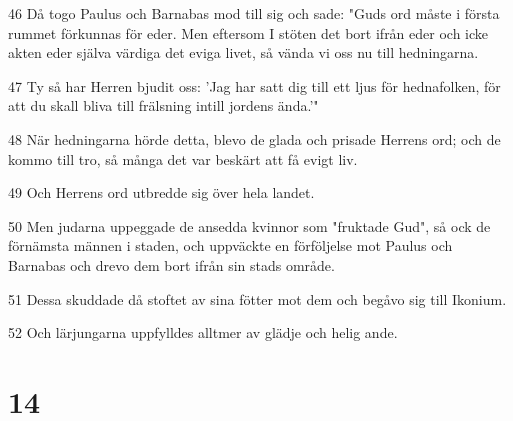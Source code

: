\par 46 Då togo Paulus och Barnabas mod till sig och sade: "Guds ord måste i första rummet förkunnas för eder. Men eftersom I stöten det bort ifrån eder och icke akten eder själva värdiga det eviga livet, så vända vi oss nu till hedningarna.
\par 47 Ty så har Herren bjudit oss: 'Jag har satt dig till ett ljus för hednafolken, för att du skall bliva till frälsning intill jordens ända.'"
\par 48 När hedningarna hörde detta, blevo de glada och prisade Herrens ord; och de kommo till tro, så många det var beskärt att få evigt liv.
\par 49 Och Herrens ord utbredde sig över hela landet.
\par 50 Men judarna uppeggade de ansedda kvinnor som "fruktade Gud", så ock de förnämsta männen i staden, och uppväckte en förföljelse mot Paulus och Barnabas och drevo dem bort ifrån sin stads område.
\par 51 Dessa skuddade då stoftet av sina fötter mot dem och begåvo sig till Ikonium.
\par 52 Och lärjungarna uppfylldes alltmer av glädje och helig ande.

\chapter{14}

